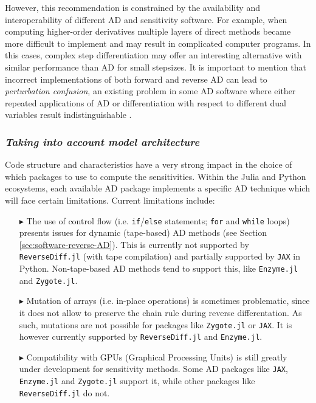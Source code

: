 However, this recommendation is constrained by the availability and interoperability of different AD and sensitivity software. 
For example, when computing higher-order derivatives multiple layers of direct methods became more difficult to implement and may result in complicated computer programs.
In this cases, complex step differentiation may offer an interesting alternative with similar performance than AD for small stepsizes. 
It is important to mention that incorrect implementations of both forward and reverse AD can lead to \textit{perturbation confusion}, an existing problem in some AD software where either repeated applications of AD or differentiation with respect to different dual variables result indistinguishable \cite{siskind2005perturbation, manzyuk2019perturbation}. 


\subsubsection*{\textit{Taking into account model architecture}}

Code structure and characteristics have a very strong impact in the choice of which packages to use to compute the sensitivities. 
Within the Julia and Python ecosystems, each available AD package implements a specific AD technique which will face certain limitations.
Current limitations include:
\begin{enumerate}
    \item[$ \blacktriangleright$] The use of control flow (i.e. \texttt{if}/\texttt{else} statements; \texttt{for} and \texttt{while} loops) presents issues for dynamic (tape-based) AD methods (see Section \ref{sec:software-reverse-AD}). 
    This is currently not supported by \texttt{ReverseDiff.jl} (with tape compilation) and partially supported by \texttt{JAX} in Python. 
    Non-tape-based AD methods tend to support this, like \texttt{Enzyme.jl} and \texttt{Zygote.jl}.
    \item[$ \blacktriangleright$] Mutation of arrays (i.e. in-place operations) is sometimes problematic, since it does not allow to preserve the chain rule during reverse differentation. As such, mutations are not possible for packages like \texttt{Zygote.jl} or \texttt{JAX}. It is however currently supported by \texttt{ReverseDiff.jl} and \texttt{Enzyme.jl}.
    \item[$ \blacktriangleright$] Compatibility with GPUs (Graphical Processing Units) is still greatly under development for sensitivity methods. 
    Some AD packages like \texttt{JAX}, \texttt{Enzyme.jl} and \texttt{Zygote.jl} support it, while other packages like \texttt{ReverseDiff.jl} do not. 
\end{enumerate}

